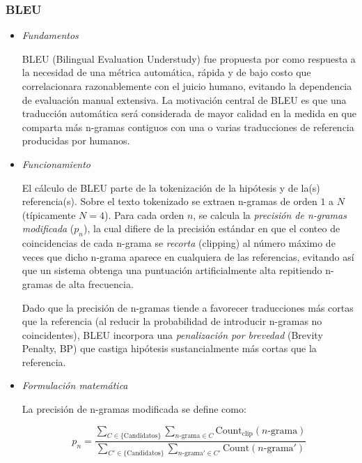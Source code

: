 \subsubsection{BLEU}
\vspace{-0.1cm}
\begin{itemize}
\item \textit{Fundamentos} \\
\vspace{-0.5cm}

BLEU (Bilingual Evaluation Understudy) fue propuesta por \citet{papineni2002bleu} como respuesta a la necesidad de una métrica automática, rápida y de bajo costo que correlacionara razonablemente con el juicio humano, evitando la dependencia de evaluación manual extensiva. La motivación central de BLEU es que una traducción automática será considerada de mayor calidad en la medida en que comparta más n-gramas contiguos con una o varias traducciones de referencia producidas por humanos.

\item \textit{Funcionamiento}\\
\vspace{-0.5cm}

El cálculo de BLEU parte de la tokenización de la hipótesis y de la(s) referencia(s). Sobre el texto tokenizado se extraen n-gramas de orden $1$ a $N$ (típicamente $N=4$). Para cada orden $n$, se calcula la \textit{precisión de n-gramas modificada} ($p_n$), la cual difiere de la precisión estándar en que el conteo de coincidencias de cada n-grama se \textit{recorta} (clipping) al número máximo de veces que dicho n-grama aparece en cualquiera de las referencias, evitando así que un sistema obtenga una puntuación artificialmente alta repitiendo n-gramas de alta frecuencia.

Dado que la precisión de n-gramas tiende a favorecer traducciones más cortas que la referencia (al reducir la probabilidad de introducir n-gramas no coincidentes), BLEU incorpora una \textit{penalización por brevedad} (Brevity Penalty, BP) que castiga hipótesis sustancialmente más cortas que la referencia.

\item\textit{Formulación matemática} \\
\vspace{-0.5cm}

La precisión de n-gramas modificada se define como:

\begin{equation}
p_n = \frac{\sum_{C \in \{\text{Candidatos}\}} \sum_{n\text{-grama} \in C} \text{Count}_{\text{clip}}(n\text{-grama})}{\sum_{C' \in \{\text{Candidatos}\}} \sum_{n\text{-grama}' \in C'} \text{Count}(n\text{-grama}')}
\end{equation}


\end{itemize}
